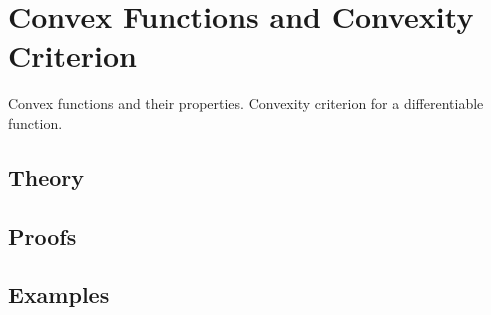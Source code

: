 
\section{Convex Functions and Convexity Criterion}
\label{sec:2.4.03-convex-functions}

\begin{ticket}
Convex functions and their properties. Convexity criterion for a differentiable function.
\end{ticket}

\subsection*{Theory}

\subsection*{Proofs}

\subsection*{Examples}
